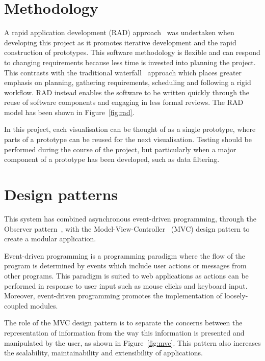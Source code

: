 \section{Methodology} {
\label{sec:methodology}

	A rapid application development (RAD) approach~\parencite{martin1991rapid} was undertaken when developing this project as it promotes iterative development and the rapid construction of prototypes. This software methodology is flexible and can respond to changing requirements because less time is invested into planning the project. This contrasts with the traditional waterfall~\parencite{huo2004software} approach which places greater emphasis on planning, gathering requirements, scheduling and following a rigid workflow. RAD instead enables the software to be written quickly through the reuse of software components and engaging in less formal reviews. The RAD model has been shown in Figure~\ref{fig:rad}.

	

	In this project, each visualisation can be thought of as a single prototype, where parts of a prototype can be reused for the next visualisation. Testing should be performed during the course of the project, but particularly when a major component of a prototype has been developed, such as data filtering.
		
}

\section{Design patterns} {
\label{sec:design_patterns}

	This system has combined asynchronous event-driven programming, through the Observer pattern~\parencite{osmani2012learning}, with the Model-View-Controller~\parencite{krasner1988description} (MVC) design pattern to create a modular application.

	Event-driven programming is a programming paradigm where the flow of the program is determined by events which include user actions or messages from other programs. This paradigm is suited to web applications as actions can be performed in response to user input such as mouse clicks and keyboard input. Moreover, event-driven programming promotes the implementation of loosely-coupled modules.

	The role of the MVC design pattern is to separate the concerns between the representation of information from the way this information is presented and manipulated by the user, as shown in Figure~\ref{fig:mvc}. This pattern also increases the scalability, maintainability and extensibility of applications.

	

}

